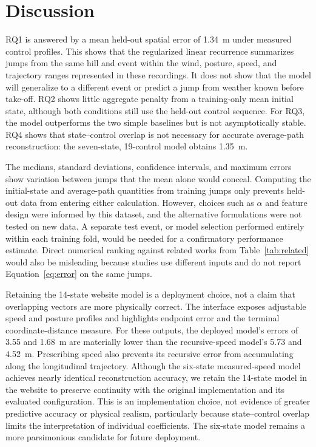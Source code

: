 \documentclass[11pt,twoside,a4paper]{article}
\begin{document}
\section{Discussion}\label{sec:discussion}

RQ1 is answered by a mean held-out spatial error of 1.34~m under measured control profiles. This shows that the regularized linear recurrence summarizes jumps from the same hill and event within the wind, posture, speed, and trajectory ranges represented in these recordings. It does not show that the model will generalize to a different event or predict a jump from weather known before take-off. RQ2 shows little aggregate penalty from a training-only mean initial state, although both conditions still use the held-out control sequence. For RQ3, the model outperforms the two simple baselines but is not asymptotically stable. RQ4 shows that state--control overlap is not necessary for accurate average-path reconstruction: the seven-state, 19-control model obtains 1.35~m. 

The medians, standard deviations, confidence intervals, and maximum errors show variation between jumps that the mean alone would conceal. Computing the initial-state and average-path quantities from training jumps only prevents held-out data from entering either calculation. However, choices such as $\alpha$ and feature design were informed by this dataset, and the alternative formulations were not tested on new data. A separate test event, or model selection performed entirely within each training fold, would be needed for a confirmatory performance estimate. Direct numerical ranking against related works from Table~\ref{tab:related} would also be misleading because studies use different inputs and do not report Equation~\eqref{eq:error} on the same jumps.

Retaining the 14-state website model is a deployment choice, not a claim that overlapping vectors are more physically correct. The interface exposes adjustable speed and posture profiles and highlights endpoint error and the terminal coordinate-distance measure. For these outputs, the deployed model's errors of 3.55 and 1.68~m are materially lower than the recursive-speed model's 5.73 and 4.52~m. Prescribing speed also prevents its recursive error from accumulating along the longitudinal trajectory. Although the six-state measured-speed model achieves nearly identical reconstruction accuracy, we retain the 14-state model in the website to preserve continuity with the original implementation and its evaluated configuration. This is an implementation choice, not evidence of greater predictive accuracy or physical realism, particularly because state--control overlap limits the interpretation of individual coefficients. The six-state model remains a more parsimonious candidate for future deployment.
\end{document}
